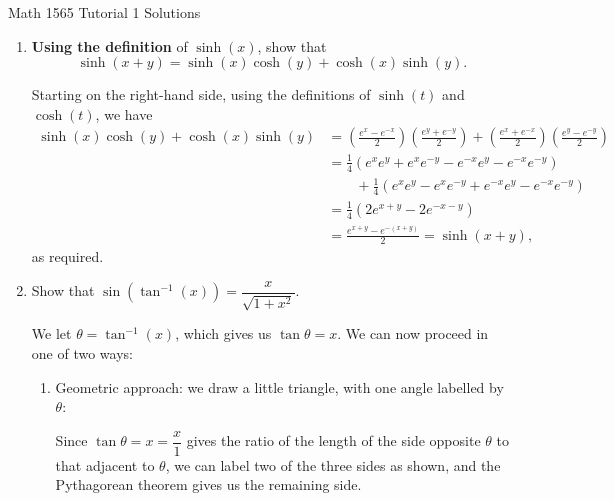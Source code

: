 \documentclass[12pt]{article}
\begin{document}
\begin{center}
Math 1565 Tutorial 1 Solutions
\end{center}

\author{Instructor: Sean Fitzpatrick}

\thispagestyle{empty}
\begin{enumerate}
 \item  \textbf{Using the definition} of $\sinh(x)$, show that
 \[
 \sinh(x+y) = \sinh(x)\cosh(y)+\cosh(x)\sinh(y).
 \]
 
Starting on the right-hand side, using the definitions of $\sinh(t)$ and $\cosh(t)$, we have
\begin{align*}
\sinh(x)\cosh(y)+\cosh(x)\sinh(y) & = \left(\frac{e^x-e^{-x}}{2}\right)\left(\frac{e^y+e^{-y}}{2}\right)+\left(\frac{e^x+e^{-x}}{2}\right)\left(\frac{e^y-e^{-y}}{2}\right)\\
& = \frac{1}{4}\left(e^xe^y+e^xe^{-y}-e^{-x}e^y-e^{-x}e^{-y}\right)\\
& \quad \quad +\frac{1}{4}\left(e^xe^y-e^xe^{-y}+e^{-x}e^y-e^{-x}e^{-y}\right)\\
& = \frac{1}{4}\left(2e^{x+y}-2e^{-x-y}\right)\\
& = \frac{e^{x+y}-e^{-(x+y)}}{2} = \sinh(x+y),
\end{align*}
as required.

\bigskip

 
 \item Show that $\sin(\tan^{-1}(x)) = \dfrac{x}{\sqrt{1+x^2}}$.
 
 \bigskip
 
 We let $\theta=\tan^{-1}(x)$, which gives us $\tan\theta=x$. We can now proceed in one of two ways:
 
 \begin{enumerate}
 \item Geometric approach: we draw a little triangle, with one angle labelled by $\theta$:
 \begin{multicols}{2}
 Since $\tan\theta = x = \dfrac{x}{1}$ gives the ratio of the length of the side opposite $\theta$ to that adjacent to $\theta$, we can label two of the three sides as shown, and the Pythagorean theorem gives us the remaining side.
 \columnbreak
 \begin{center}
 \end{center}
 \end{multicols}
 \end{enumerate}
\end{enumerate}
\end{document}
